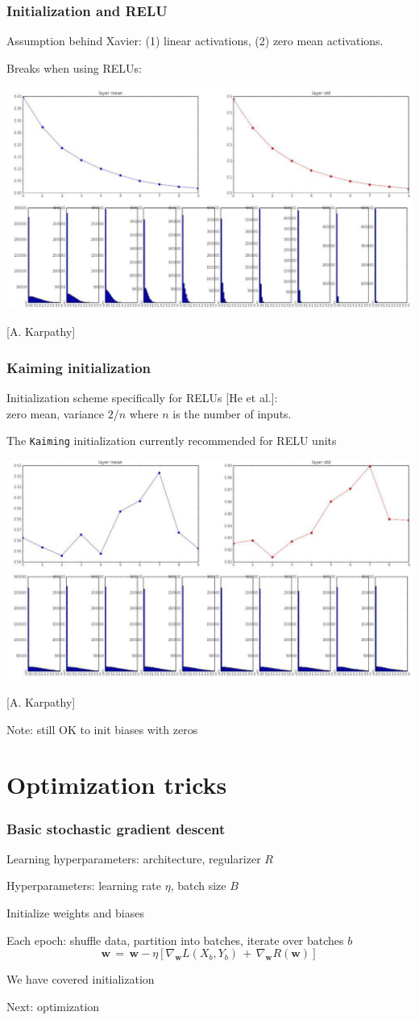 \documentclass[xcolor=dvipsnames]{beamer}
\begin{document}
\begin{frame}
  \frametitle{Initialization and RELU}
  \bi
\item Assumption behind Xavier: (1) linear activations, (2) zero mean
  activations. 
\item Breaks when using RELUs:

\includegraphics[width=.6\textwidth]{ak-layer-stats-xavier-init-relu}

[A. Karpathy]
\ei
\end{frame}

\begin{frame}
  \frametitle{Kaiming initialization}
  \bi
\item Initialization scheme specifically for RELUs [He et al.]:\\
zero mean, variance $2/n$ where $n$ is the number of inputs.
\item The \texttt{Kaiming} initialization currently recommended for
  RELU units

\includegraphics[width=.6\textwidth]{ak-layer-stats-kaiming-init}

[A. Karpathy]
\item Note: still OK to init biases with zeros
\ei
\end{frame}

\section{Optimization tricks}

\begin{frame}
  \frametitle{Basic stochastic gradient descent}
  \bi
\item Learning hyperparameters: architecture, regularizer $R$
\item Hyperparameters: learning rate $\eta$, batch size $B$
\item Initialize weights and biases
\item Each epoch: shuffle data, partition into batches, iterate over
  batches $b$
\[\mathbf{w}\,=\,\mathbf{w}-\eta\left[
    \nabla_{\mathbf{w}}L(X_b,Y_b)\,+\,\nabla_{\mathbf{w}}R(\mathbf{w})
\right]
\]
\item We have covered initialization
\item Next: optimization
\ei
\end{frame}
\end{document}
